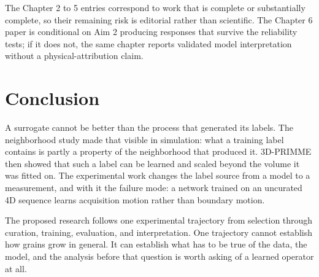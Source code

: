 \documentclass[proposalMode]{ufdissertation}
\begin{document}
The Chapter 2 to 5 entries correspond to work that is complete or substantially complete, so their remaining risk is editorial rather than scientific. The Chapter 6 paper is conditional on Aim 2 producing responses that survive the reliability tests; if it does not, the same chapter reports validated model interpretation without a physical-attribution claim.


\chapter{Conclusion}

A surrogate cannot be better than the process that generated its labels. The neighborhood study made that visible in simulation: what a training label contains is partly a property of the neighborhood that produced it. 3D-PRIMME then showed that such a label can be learned and scaled beyond the volume it was fitted on. The experimental work changes the label source from a model to a measurement, and with it the failure mode: a network trained on an uncurated 4D sequence learns acquisition motion rather than boundary motion.

The proposed research follows one experimental trajectory from selection through curation, training, evaluation, and interpretation. One trajectory cannot establish how grains grow in general. It can establish what has to be true of the data, the model, and the analysis before that question is worth asking of a learned operator at all.
\end{document}
